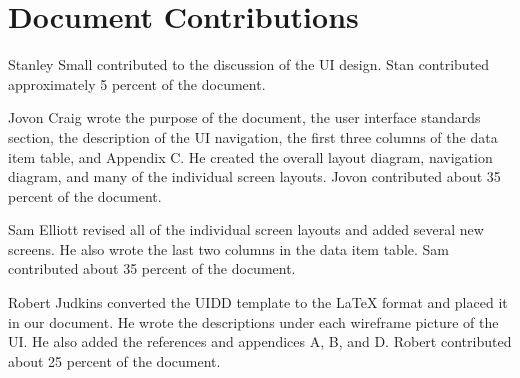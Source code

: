 \documentclass{article}
\begin{document}
\newpage
\section{Document Contributions}

Stanley Small contributed to the discussion of the UI design. Stan contributed approximately 5 percent of the document.

Jovon Craig wrote the purpose of the document, the user interface standards section, the description of the UI navigation, the first three columns of the data item table, and Appendix C. He created the overall layout diagram, navigation diagram, and many of the individual screen layouts. Jovon contributed about 35 percent of the document.

Sam Elliott revised all of the individual screen layouts and added several new screens. He also wrote the last two columns in the data item table. Sam contributed about 35 percent of the document.

Robert Judkins converted the UIDD template to the LaTeX format and placed it in our document. He wrote the descriptions under each wireframe picture of the UI. He also added the references and appendices A, B, and D. Robert contributed about 25 percent of the document.

\newpage




\newpage



\end{document}

